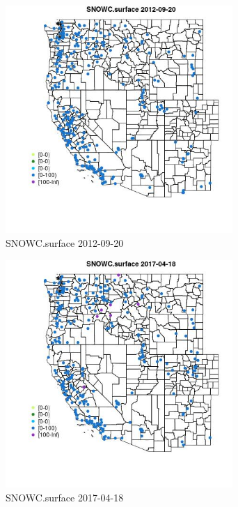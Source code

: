 \begin{figure} 
\centering  
\includegraphics[width=0.77\textwidth]{Code_Outputs/Report_ML_input_PM25_Step4_part_e_de_duplicated_aves_compiled_2019-05-14wNAs_MapObsSNOWCsurface2012-09-20.jpg} 
\caption{\label{fig:Report_ML_input_PM25_Step4_part_e_de_duplicated_aves_compiled_2019-05-14wNAsMapObsSNOWCsurface2012-09-20}SNOWC.surface 2012-09-20} 
\end{figure} 
 

\begin{figure} 
\centering  
\includegraphics[width=0.77\textwidth]{Code_Outputs/Report_ML_input_PM25_Step4_part_e_de_duplicated_aves_compiled_2019-05-14wNAs_MapObsSNOWCsurface2017-04-18.jpg} 
\caption{\label{fig:Report_ML_input_PM25_Step4_part_e_de_duplicated_aves_compiled_2019-05-14wNAsMapObsSNOWCsurface2017-04-18}SNOWC.surface 2017-04-18} 
\end{figure} 
 

